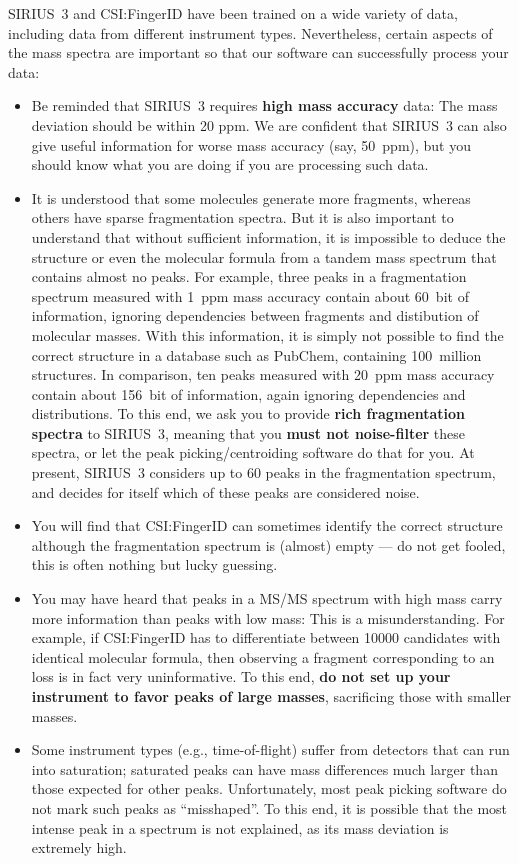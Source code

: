 \documentclass[letterpaper,10pt,openany,oneside]{sphinxmanual}
\begin{document}
SIRIUS~3 and CSI:FingerID have been trained on a wide variety of data,
including data from different instrument types.  Nevertheless, certain
aspects of the mass spectra are important so that our software can
successfully process your data:
%
\begin{itemize}
\item Be reminded that SIRIUS~3 requires \textbf{high mass accuracy} data:
  The mass deviation should be within 20 ppm.  We are confident that
  SIRIUS~3 can also give useful information for worse mass accuracy (say,
  50~ppm), but you should know what you are doing if you are processing such
  data.

\item It is understood that some molecules generate more fragments, whereas
  others have sparse fragmentation spectra.  But it is also important to
  understand that without sufficient information, it is impossible to deduce
  the structure or even the molecular formula from a tandem mass spectrum
  that contains almost no peaks.  For example, three peaks in a fragmentation
  spectrum measured with 1~ppm mass accuracy contain about 60~bit of
  information, ignoring dependencies between fragments and distibution of
  molecular masses.  With this information, it is simply not possible to find
  the correct structure in a database such as PubChem, containing 100~million
  structures.  In comparison, ten peaks measured with 20~ppm mass accuracy
  contain about 156~bit of information, again ignoring dependencies and
  distributions.  To this end, we ask you to provide \textbf{rich
  fragmentation spectra} to SIRIUS~3, meaning that you \textbf{must not
  noise-filter} these spectra, or let the peak picking/centroiding software
  do that for you.  At present, SIRIUS~3 considers up to 60 peaks in the
  fragmentation spectrum, and decides for itself which of these peaks are
  considered noise.

\item You will find that CSI:FingerID can sometimes identify the correct
  structure although the fragmentation spectrum is (almost) empty --- do not
  get fooled, this is often nothing but lucky guessing.

\item You may have heard that peaks in a MS/MS spectrum with high mass
  carry more information than peaks with low mass: This is a
  misunderstanding.  For example, if CSI:FingerID has to differentiate
  between 10000 candidates with identical molecular formula, then observing a
  fragment corresponding to an  loss is in fact very uninformative.
  To this end, \textbf{do not set up your instrument to favor peaks of large
  masses}, sacrificing those with smaller masses.

\item Some instrument types (e.g., time-of-flight) suffer from detectors that
  can run into saturation; saturated peaks can have mass differences much
  larger than those expected for other peaks.  Unfortunately, most peak
  picking software do not mark such peaks as ``misshaped''.  To this end, it
  is possible that the most intense peak in a spectrum is not explained, as
  its mass deviation is extremely high.
\end{itemize}
\end{document}
